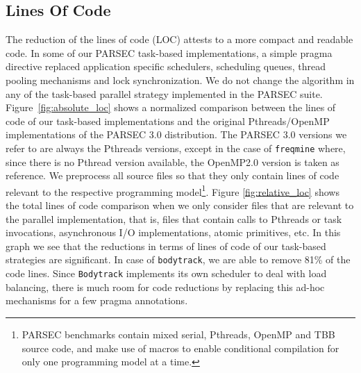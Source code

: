 \subsection{Lines Of Code}
\label{sec:lines}
The reduction of the lines of code (LOC) attests to a more compact and readable code.
In some of our PARSEC task-based implementations, a simple pragma directive replaced application 
specific schedulers, scheduling queues, thread pooling mechanisms and lock synchronization.
We do not change the algorithm in any of the task-based parallel strategy implemented in the PARSEC suite.
Figure~\ref{fig:absolute_loc} shows a normalized comparison between the lines of code of our task-based implementations and the original Pthreads/OpenMP implementations of the PARSEC 3.0 distribution.
The PARSEC 3.0 versions we refer to are always the Pthreads versions, except in the case of \texttt{freqmine} where, since there is no Pthread version available, the OpenMP2.0 version is taken as reference.
We preprocess all source files so that they only contain lines of code relevant to the respective programming model\footnote{PARSEC benchmarks contain mixed serial, Pthreads, OpenMP and TBB source code, and make use of macros to enable conditional compilation for only one programming model at a time.}.
Figure \ref{fig:relative_loc} shows the total lines of code comparison when we only consider files that are relevant to the parallel 
implementation, that is, files that contain calls to Pthreads or task invocations, asynchronous I/O implementations, atomic primitives, etc.
In this graph we see that the reductions in terms of lines of code of our task-based strategies are significant.
In case of \texttt{bodytrack}, we are able to remove 81\% of the code lines. Since \texttt{Bodytrack} implements its own scheduler to deal with load balancing, there is much room for code reductions by replacing this ad-hoc mechanisms for a few pragma annotations.

